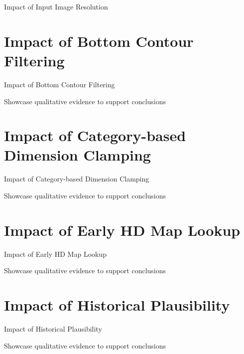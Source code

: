 Impact of Input Image Resolution

\newpage


\section{Impact of Bottom Contour Filtering}
\label{sec:impactcontourfiltering}

Impact of Bottom Contour Filtering

Showcase qualitative evidence to support conclusions

\newpage


\section{Impact of Category-based Dimension Clamping}
\label{sec:impactsizefiltering}

Impact of Category-based Dimension Clamping

Showcase qualitative evidence to support conclusions

\newpage


\section{Impact of Early HD Map Lookup}
\label{sec:impactearlymap}

Impact of Early HD Map Lookup

Showcase qualitative evidence to support conclusions

\newpage


\section{Impact of Historical Plausibility}
\label{sec:impacthistplausibility}

Impact of Historical Plausibility

Showcase qualitative evidence to support conclusions

\newpage


